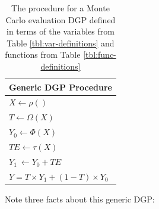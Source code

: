\documentclass[../main.tex]{subfiles}
\begin{document}
\begin{table}[H]
\centering
\begin{tabular}{|l|}
\hline
\textbf{Generic DGP Procedure} \\ \hline

 \( X \leftarrow  \rho  \left(  \right)  \) \\

 \( T \leftarrow  \Omega  \left( X \right)  \) \\

 \( Y_{0} \leftarrow  \Phi  \left( X \right)  \) \\

 \( TE \leftarrow  \tau \left( X \right)  \) \\

 \( Y_{1}~ \leftarrow Y_{0}+ TE \) \\

 \( Y = T \times Y_{1}+  \left( 1-T \right)  \times Y_{0} \) \\
 \hline
\end{tabular}
\caption{The procedure for a Monte Carlo evaluation DGP defined in terms of the variables from Table \ref{tbl:var-definitions} and functions from Table \ref{tbl:func-definitions}}
\end{table}
\label{tbl:generic-dgp-definition}
\vspace{\baselineskip}

Note three facts about this generic DGP:\par
\end{document}
